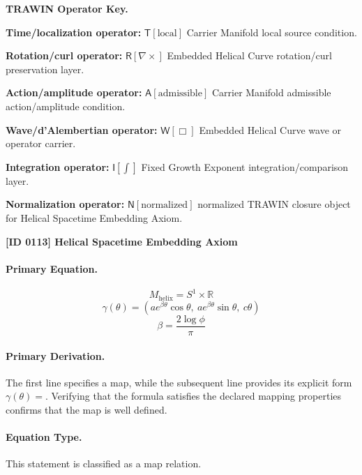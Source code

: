\par\vspace{0.45\baselineskip}
\noindent\begin{minipage}[t]{\linewidth}
\begingroup
\small
\raggedright
\textbf{TRAWIN Operator Key.}\par
\noindent\textbf{Time/localization operator:} $\mathsf{T}\!\left[\mathrm{local}\right]$ Carrier Manifold local source condition.\par
\noindent\textbf{Rotation/curl operator:} $\mathsf{R}\!\left[\nabla\times\right]$ Embedded Helical Curve rotation/curl preservation layer.\par
\noindent\textbf{Action/amplitude operator:} $\mathsf{A}\!\left[\mathrm{admissible}\right]$ Carrier Manifold admissible action/amplitude condition.\par
\noindent\textbf{Wave/d'Alembertian operator:} $\mathsf{W}\!\left[\Box\right]$ Embedded Helical Curve wave or operator carrier.\par
\noindent\textbf{Integration operator:} $\mathsf{I}\!\left[\int\right]$ Fixed Growth Exponent integration/comparison layer.\par
\noindent\textbf{Normalization operator:} $\mathsf{N}\!\left[\mathrm{normalized}\right]$ normalized TRAWIN closure object for Helical Spacetime Embedding Axiom.\par
\endgroup
\end{minipage}

\clearpage
\noindent\textbf{[ID 0113] Helical Spacetime Embedding Axiom}\par
\vspace{0.35em}
\paragraph{Primary Equation.}
\[
M_{\mathrm{helix}} = S^1 \times \mathbb{R}
\]
\[
\gamma(\theta)=
\left(
a e^{\beta \theta}\cos\theta,\ 
a e^{\beta \theta}\sin\theta,\ 
c\theta
\right)
\]
\[
\beta = \frac{2\log \phi}{\pi}
\]

\paragraph{Primary Derivation.}
The first line specifies a map, while the subsequent line provides its explicit form \( \gamma(\theta)= \). Verifying that the formula satisfies the declared mapping properties confirms that the map is well defined.
\paragraph{Equation Type.}
This statement is classified as a map relation.

